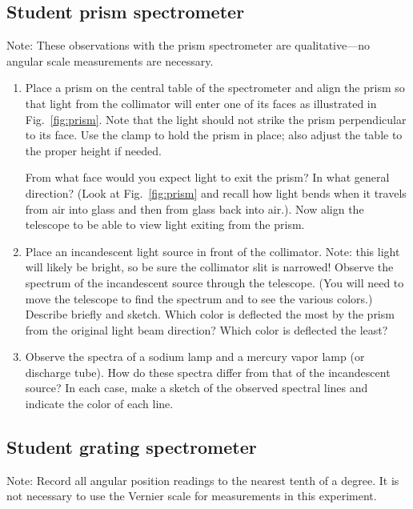 \subsection{Student prism spectrometer}
Note: These observations with the prism spectrometer are qualitative---no
angular scale measurements are necessary.

\begin{enumerate}

\item Place a prism on the central table of the spectrometer and align the prism
  so that light from the collimator will enter one of its faces as illustrated
  in Fig.~\ref{fig:prism}.  Note that the light should not strike the prism
  perpendicular to its face. Use the clamp to hold the prism in place; also
  adjust the table to the proper height if needed.

  From what face would you expect light to exit the prism? In what general
  direction? (Look at Fig.~\ref{fig:prism} and recall how light bends when it
  travels from air into glass and then from glass back into air.). Now align the
  telescope to be able to view light exiting from the prism.

\item Place an incandescent light source in front of the collimator.  Note: this
  light will likely be bright, so be sure the collimator slit is narrowed!
  Observe the spectrum of the incandescent source through the telescope.  (You
  will need to move the telescope to find the spectrum and to see the various
  colors.)  Describe briefly and sketch.  Which color is deflected the most by
  the prism from the original light beam direction?  Which color is deflected
  the least?

\item Observe the spectra of a sodium lamp and a mercury vapor lamp (or
  discharge tube). How do these spectra differ from that of the incandescent
  source? In each case, make a sketch of the observed spectral lines and
  indicate the color of each line.
  
\end{enumerate}

\subsection{Student grating spectrometer}

Note: Record all angular position readings to the nearest tenth of a degree.  It
is not necessary to use the Vernier scale for measurements in this experiment.

